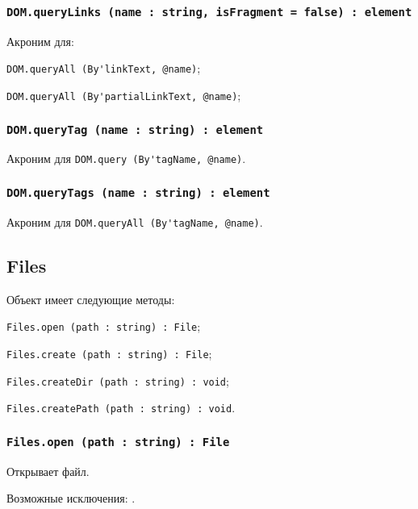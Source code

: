 \subsubsection{\lstinline|DOM.queryLinks (name : string, isFragment = false) : element|}

Акроним для:
\begin{icItems}
	\item \lstinline|DOM.queryAll (By'linkText, @name)|;
	\item \lstinline|DOM.queryAll (By'partialLinkText, @name)|;
\end{icItems}

\subsubsection{\lstinline|DOM.queryTag (name : string) : element|}

Акроним для \lstinline|DOM.query (By'tagName, @name)|.

\subsubsection{\lstinline|DOM.queryTags (name : string) : element|}

Акроним для \lstinline|DOM.queryAll (By'tagName, @name)|.

\subsection{{\color{orange} Files}}

Объект \files{} имеет следующие методы:
\begin{icItems}
	\item \lstinline|Files.open (path : string) : File|;
	\item \lstinline|Files.create (path : string) : File|;
	\item \lstinline|Files.createDir (path : string) : void|;
	\item \lstinline|Files.createPath (path : string) : void|.
\end{icItems}

\subsubsection{\lstinline|Files.open (path : string) : File|}

Открывает файл.

Возможные исключения: .

